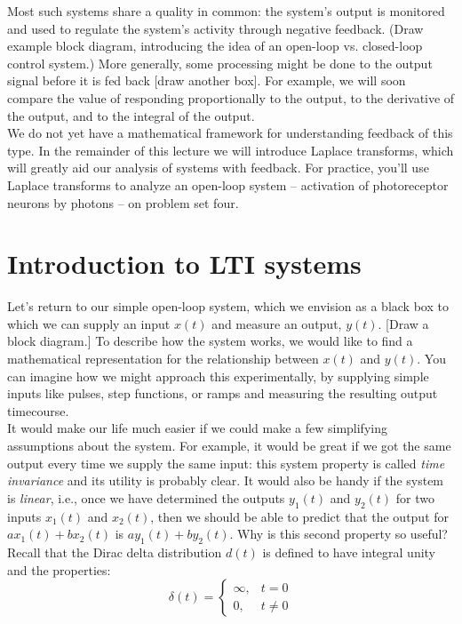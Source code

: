 \documentclass{article}
\begin{document}
Most such systems share a quality in common: the system's output is monitored and used to regulate the system's activity through negative feedback. (Draw example block diagram, introducing the idea of an open-loop vs. closed-loop control system.) More generally, some processing might be done to the output signal before it is fed back [draw another box]. For example, we will soon compare the value of responding proportionally to the output, to the derivative of the output, and to the integral of the output.\\

We do not yet have a mathematical framework for understanding feedback of this type. In the remainder of this lecture we will introduce Laplace transforms, which will greatly aid our analysis of systems with feedback. For practice, you'll use Laplace transforms to analyze an open-loop system -- activation of photoreceptor neurons by photons -- on problem set four.

\section*{Introduction to LTI systems}

Let's return to our simple open-loop system, which we envision as a black box to which we can supply an input $x(t)$ and measure an output, $y(t)$. [Draw a block diagram.] To describe how the system works, we would like to find a mathematical representation for the relationship between $x(t)$ and $y(t)$. You can imagine how we might approach this experimentally, by supplying simple inputs like pulses, step functions, or ramps and measuring the resulting output timecourse. \\

It would make our life much easier if we could make a few simplifying assumptions about the system. For example, it would be great if we got the same output every time we supply the same input: this system property is called \textit{time invariance} and its utility is probably clear. It would also be handy if the system is \textit{linear}, i.e., once we have determined the outputs $y_1(t)$ and $y_2(t)$ for two inputs $x_1(t)$ and $x_2(t)$, then we should be able to predict that the output for $ax_1(t) + bx_2(t)$ is  $ay_1(t) + by_2(t)$. Why is this second property so useful?\\

Recall that the Dirac delta distribution $d(t)$ is defined to have integral unity and the properties:
\[ \delta(t)=\begin{cases}
    \infty, & t = 0\\
    0, & t \neq 0
  \end{cases} \]
  
\end{document}
